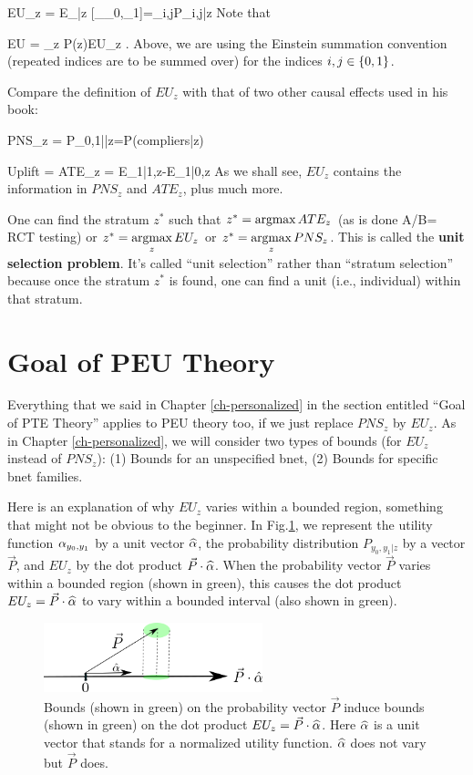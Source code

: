 \beq
EU_z = E_{|z}
[\alp_{\rvy_0,\rvy_1}]=\alp_{i,j}P_{i,j|z}
\eeq
Note that

\beq
EU = \sum_z  P(z)EU_z
\;.
\eeq
Above, we are using the Einstein
 summation convention
(repeated indices are to be summed over)
for the indices $i,j\in \{0,1\}$.

Compare the definition of $EU_z$
with that of two other causal effects used 
in his book:

\beq
PNS_z = P_{0,1||z}=P(compliers|z)
\eeq

\beq
Uplift = ATE_z = E_{1|1,z}-E_{1|0,z}
\eeq
As we shall see,
$EU_z$ contains the information
in $PNS_z$ and $ATE_z$,  plus much more.

 
One can
find the stratum $z^*$
such that
$z^*=\mathop{\mathrm{argmax}}\limits ATE_z$ (as is done A/B= RCT testing) or
 $z^*=\mathop{\mathrm{argmax}}\limits_z EU_z$ or
$z^*=\mathop{\mathrm{argmax}}\limits_z PNS_z$.
This is called the
{\bf unit selection problem}.
It's called \enquote{unit selection}
rather than \enquote{stratum selection}
because once the  
stratum $z^*$ is found,
one can find a unit 
(i.e., individual) within
that stratum.







\section{Goal of PEU Theory}
Everything that we said 
in Chapter \ref{ch-personalized}
in the section entitled \enquote{Goal
of PTE Theory}
applies to PEU theory too,
if we just replace $PNS_z$
by $EU_z$.
As in Chapter \ref{ch-personalized}, 
we will consider two types of bounds (for
$EU_z$ instead of $PNS_z$):
(1) Bounds for an unspecified bnet,
(2) Bounds for specific bnet families.


Here is
an explanation 
of why $EU_z$
varies within a bounded region,
something that might 
not be obvious to the beginner.
In  Fig.\ref{fig-peu-utility},
we represent the utility
function $\alpha_{y_0, y_1}$
by a unit vector ${\widehat{\alpha}}$,
the probability distribution 
$P_{y_0, y_1|z}$ by a vector $\vec{P}$,
and $EU_z$ by the dot product 
$\vec{P}\cdot {\widehat{\alpha}}$.
When the probability
vector $\vec{P}$ varies within a bounded region
(shown in green),
this causes
the dot 
product $EU_z=\vec{P}\cdot {\widehat{\alpha}}$
to vary within a bounded interval (also
shown in green).



\begin{figure}[h!]
\centering
\includegraphics[width=2.5in]
{personalized-exp-util/utility.png}
\caption{Bounds (shown in green)
on the probability
vector $\vec{P}$
induce bounds (shown in green) on the dot 
product $EU_z=\vec{P}\cdot {\widehat{\alpha}}$.
Here ${\widehat{\alpha}}$ is a unit vector
that stands for a normalized 
utility function. ${\widehat{\alpha}}$
does not vary but $\vec{P}$ does.
} 
\label{fig-peu-utility}
\end{figure}

